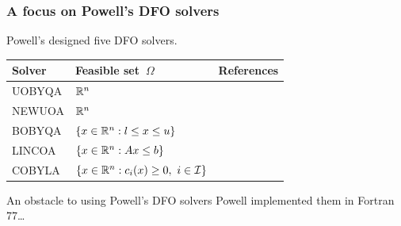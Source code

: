 \documentclass{polyu-presentation}
\newcommand{\con}[1][]{c\ifthenelse{\equal{#1}{}}{}{_{#1}}}
\newcommand{\iub}{\mathcal{I}}
\newcommand{\xl}{l}
\newcommand{\xu}{u}
\begin{document}
\begin{frame}
    \frametitle{A focus on Powell's DFO solvers}
    
	Powell's designed five DFO solvers.

    \medskip

    \begin{center}
        \begin{tabular}{lll}
            \toprule
            Solver  & Feasible set~$\Omega$                                 & References\\
            \midrule
            UOBYQA  & $\mathbb{R}^n$                                                & \textcite{Powell_2002}\\
            NEWUOA  & $\mathbb{R}^n$                                                & \textcite{Powell_2006}\\
            BOBYQA  & $\set{x \in \R^n : \xl \le x \le \xu}$                & \textcite{Powell_2009}\\
            LINCOA  & $\{x \in \mathbb{R}^n : A x \le b\}$                        & \textcite{Powell_2015}\\
            COBYLA  & $\set{x \in \R^n : \con[i](x) \ge 0, ~ i \in \iub}$   & \textcite{Powell_1994}\\
            \bottomrule
        \end{tabular}
    \end{center}

    \medskip

    \begin{block}{An obstacle to using Powell’s DFO solvers}
        Powell implemented them in \alert{Fortran 77}\dots
    \end{block}
\end{frame}
\end{document}
